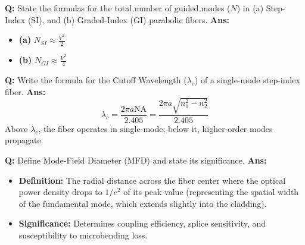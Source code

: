 \documentclass[10pt,a4paper,twocolumn]{article}
\begin{document}
\begin{tcolorbox}[
  colback=white,
  colframe=UnitColorTwo,
  colbacktitle=gray!10!white,
  coltitle=black,
  fonttitle=\bfseries\sffamily\small,
  title={Unit II $\bullet$ Card 5: Number of Guided Modes ($N$)},
  boxrule=1.2pt,
  arc=2mm,
  outer arc=2mm,
  boxsep=1.5mm,
  top=1mm,
  bottom=1mm,
  left=1.5mm,
  right=1.5mm,
  before skip=2.5mm,
  after skip=2.5mm
]
\textbf{Q:} State the formulas for the total number of guided modes ($N$) in (a) Step-Index (SI), and (b) Graded-Index (GI) parabolic fibers.
\tcbline
\textbf{Ans:} \begin{itemize}
  \item   \textbf{(a)} $N_{SI} \approx \frac{V^2}{2}$
  \item   \textbf{(b)} $N_{GI} \approx \frac{V^2}{4}$
\end{itemize}
\end{tcolorbox}


\begin{tcolorbox}[
  colback=white,
  colframe=UnitColorTwo,
  colbacktitle=gray!10!white,
  coltitle=black,
  fonttitle=\bfseries\sffamily\small,
  title={Unit II $\bullet$ Card 6: Cutoff Wavelength ($\lambda_c$)},
  boxrule=1.2pt,
  arc=2mm,
  outer arc=2mm,
  boxsep=1.5mm,
  top=1mm,
  bottom=1mm,
  left=1.5mm,
  right=1.5mm,
  before skip=2.5mm,
  after skip=2.5mm
]
\textbf{Q:} Write the formula for the Cutoff Wavelength ($\lambda_c$) of a single-mode step-index fiber.
\tcbline
\textbf{Ans:} \[ \lambda_c = \frac{2\pi a \text{NA}}{2.405} = \frac{2\pi a \sqrt{n_1^2 - n_2^2}}{2.405} \]
    Above $\lambda_c$, the fiber operates in single-mode; below it, higher-order modes propagate.
\end{tcolorbox}


\begin{tcolorbox}[
  colback=white,
  colframe=UnitColorTwo,
  colbacktitle=gray!10!white,
  coltitle=black,
  fonttitle=\bfseries\sffamily\small,
  title={Unit II $\bullet$ Card 7: Mode-Field Diameter (MFD)},
  boxrule=1.2pt,
  arc=2mm,
  outer arc=2mm,
  boxsep=1.5mm,
  top=1mm,
  bottom=1mm,
  left=1.5mm,
  right=1.5mm,
  before skip=2.5mm,
  after skip=2.5mm
]
\textbf{Q:} Define Mode-Field Diameter (MFD) and state its significance.
\tcbline
\textbf{Ans:} \begin{itemize}
  \item   \textbf{Definition:} The radial distance across the fiber center where the optical power density drops to $1/e^2$ of its peak value (representing the spatial width of the fundamental mode, which extends slightly into the cladding).
  \item   \textbf{Significance:} Determines coupling efficiency, splice sensitivity, and susceptibility to microbending loss.
\end{itemize}
\end{tcolorbox}
\end{document}
